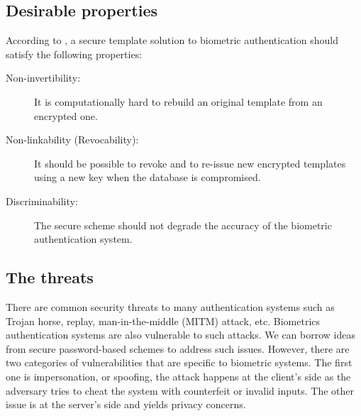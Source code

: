 \subsection{Desirable properties}
\label{sec:privacyProps}
According to \cite{jain201650}, a secure template solution to biometric
authentication should satisfy the following properties:
\begin{description}
\item[Non-invertibility:] It is computationally hard to rebuild an original
  template from an encrypted one.
\item[Non-linkability (Revocability):] It should be possible to revoke and to
  re-issue new encrypted templates using a new key when the database is
  compromised.
\item[Discriminability:] The secure scheme should not degrade the accuracy of
  the biometric authentication system.
\end{description}
\subsection{The threats}
\label{sec:privacyReqs}
There are common security threats to many authentication systems such as Trojan
horse, replay, man-in-the-middle (MITM) attack, etc. Biometrics authentication
systems are also vulnerable to such attacks. We can borrow ideas from secure
password-based schemes to address such issues. However, there are two categories
of vulnerabilities that are specific to biometric systems.  The first one is
impersonation, or spoofing, the attack happens at the client's side as the
adversary tries to cheat the system with counterfeit or invalid inputs.  The
other issue is at the server's side and yields privacy concerns.

